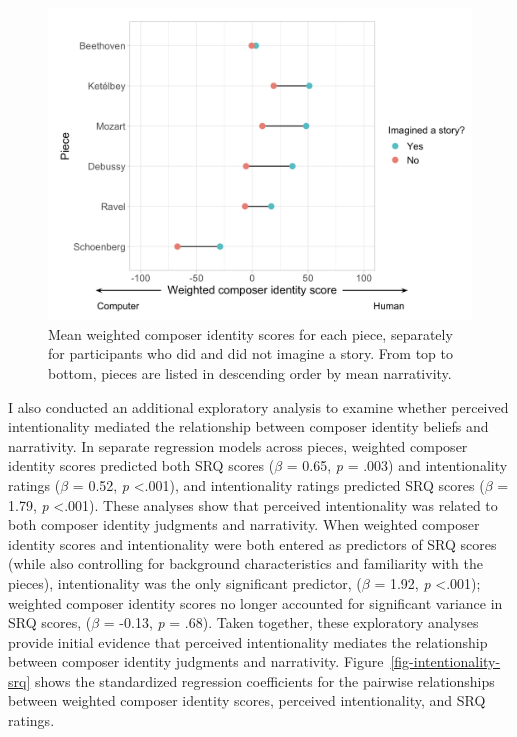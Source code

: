 \documentclass[12pt,twoside]{reedthesis}
\begin{document}
\begin{figure}[h!tbp]
	\centering
	\includegraphics[scale=0.5]{CI_SRQ.png}
	\caption{Mean weighted composer identity scores for each piece, separately for participants who did and did not imagine a story. From top to bottom, pieces are listed in descending order by mean narrativity.}
	\label{fig-ci-differences}
\end{figure}

I also conducted an additional exploratory analysis to examine whether perceived intentionality mediated the relationship between composer identity beliefs and narrativity. In separate regression models across pieces, weighted composer identity scores predicted both SRQ scores ($\beta$ = 0.65, \emph{p} = .003) and intentionality ratings ($\beta$ = 0.52, \emph{p}  \textless .001), and intentionality ratings predicted SRQ scores ($\beta$ = 1.79, \emph{p} \textless .001). These analyses show that perceived intentionality was related to both composer identity judgments and narrativity. When weighted composer identity scores and intentionality were both entered as predictors of SRQ scores (while also controlling for background characteristics and familiarity with the pieces), intentionality was the only significant predictor, ($\beta$ = 1.92, \emph{p} \textless .001); weighted composer identity scores no longer accounted for significant variance in SRQ scores, ($\beta$ = -0.13, \emph{p} = .68). Taken together, these exploratory analyses provide initial evidence that perceived intentionality mediates the relationship between composer identity judgments and narrativity. Figure~\ref*{fig-intentionality-srq} shows the standardized regression coefficients for the pairwise relationships between weighted composer identity scores, perceived intentionality, and SRQ ratings.
\end{document}
